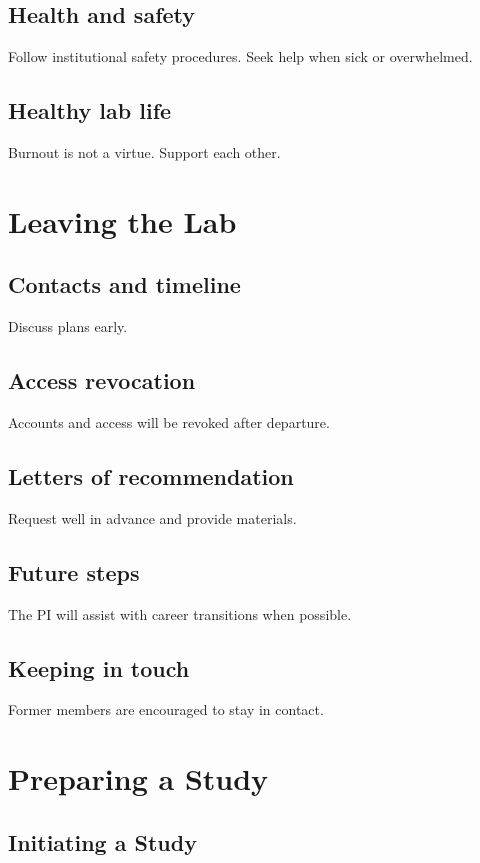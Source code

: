 \documentclass[11pt]{article}
\begin{document}
\subsection{Health and safety}
Follow institutional safety procedures.
Seek help when sick or overwhelmed.

\subsection{Healthy lab life}
Burnout is not a virtue.
Support each other.

\section{Leaving the Lab}

\subsection{Contacts and timeline}
Discuss plans early.

\subsection{Access revocation}
Accounts and access will be revoked after departure.

\subsection{Letters of recommendation}
Request well in advance and provide materials.

\subsection{Future steps}
The PI will assist with career transitions when possible.

\subsection{Keeping in touch}
Former members are encouraged to stay in contact.

\section{Preparing a Study}

\subsection{Initiating a Study}
\end{document}
